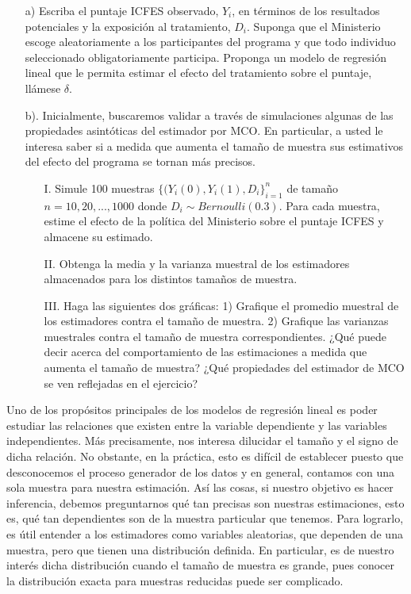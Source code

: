 \documentclass[a4paper]{article}
\begin{document}
\begin{itemize}
    \item[a)] Escriba el puntaje ICFES observado, $Y_{i}$, en términos de los resultados potenciales y la exposición al tratamiento, $D_{i}$. Suponga que el Ministerio escoge aleatoriamente a los participantes del programa y que todo individuo seleccionado obligatoriamente participa. Proponga un modelo de regresión lineal que le permita estimar el efecto del tratamiento sobre el puntaje, llámese $\delta$.
    
 
        
\item[b).] Inicialmente, buscaremos validar a través de simulaciones algunas de las propiedades asintóticas del estimador por MCO. En particular, a usted le interesa saber si a medida que aumenta el tamaño de muestra sus estimativos del efecto del programa se tornan más precisos.

\begin{itemize}
    \item[I.] Simule 100 muestras $\{(Y_{i}(0), Y_i(1), D_i\}_{i=1}^n$ de tamaño $n=10, 20, ..., 1000$   donde  $D_{i}\sim Bernoulli(0.3)$. Para cada muestra, estime el efecto de la política del Ministerio sobre el puntaje ICFES y almacene su estimado.
    
    \item[II.] Obtenga la media y la varianza muestral de los estimadores almacenados para los distintos tamaños de muestra.
    
    \item[III.] Haga las siguientes dos gráficas: 1) Grafique el promedio muestral de los estimadores contra el tamaño de muestra. 2) Grafique las varianzas muestrales contra el tamaño de muestra correspondientes. ¿Qué puede decir acerca del comportamiento de las estimaciones a medida que aumenta el tamaño de muestra? ¿Qué propiedades del estimador de MCO se ven reflejadas en el ejercicio? \\
    

\end{itemize}



    
    \end{itemize}
    
Uno de los propósitos principales de los modelos de regresión lineal es poder estudiar las relaciones que existen entre la variable dependiente y las variables independientes. Más precisamente, nos interesa dilucidar el tamaño y el signo de dicha relación. No obstante, en la práctica, esto es difícil de establecer puesto que desconocemos el proceso generador de los datos y en general, contamos con una sola muestra para nuestra estimación. Así las cosas, si nuestro objetivo es hacer inferencia, debemos  preguntarnos qué tan precisas son nuestras estimaciones, esto es, qué tan dependientes son de la muestra particular que tenemos. Para lograrlo, es útil entender a los estimadores como variables aleatorias, que dependen de una muestra, pero que tienen una distribución definida. En particular,  es de nuestro interés dicha distribución cuando el tamaño de muestra es grande, pues conocer la distribución exacta para muestras reducidas puede ser complicado.\\
\end{document}
